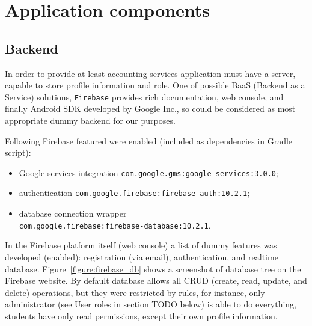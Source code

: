 \documentclass[runningheads,a4paper]{llncs}
\begin{document}
\section{Application components}

\subsection{Backend}
In order to provide at least accounting services application must have a server,
capable to store profile information and role. One of possible BaaS (Backend as
a Service) solutions, \texttt{Firebase} \cite{firebase} provides rich
documentation, web console, and finally Android SDK developed by Google Inc.,
so could be considered as most appropriate dummy backend for our purposes.

Following Firebase featured were enabled (included as dependencies in Gradle script):
\begin{itemize}
	\item Google services integration \texttt{com.google.gms:google-services:3.0.0};
	\item authentication \texttt{com.google.firebase:firebase-auth:10.2.1};
	\item database connection wrapper\\
		\texttt{com.google.firebase:firebase-database:10.2.1}.
\end{itemize}

In the Firebase platform itself (web console) a list of dummy features was
developed (enabled): registration (via email), authentication, and realtime
database. Figure~\ref{figure:firebase_db} shows a screenshot of database tree on 
the Firebase website. By default database allows all CRUD (create, read, update,
and delete) operations, but they were restricted by rules, for instance, only
administrator (see User roles in section TODO below) is able to do everything,
students have only read permissions, except their own profile information.
\end{document}
